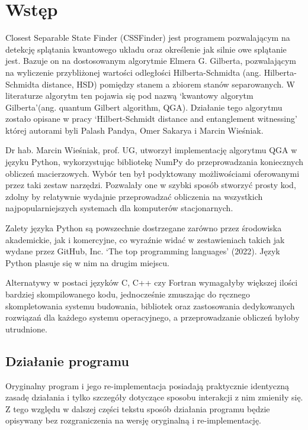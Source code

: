 \documentclass[11pt, a4paper]{article}
\begin{document}
  \begin{sloppypar}
    \section{Wstęp}
    Closest Separable State Finder (CSSFinder) jest programem pozwalającym na detekcję splątania
    kwantowego układu oraz określenie jak silnie owe splątanie jest. Bazuje on na
    dostosowanym algorytmie Elmera G. Gilberta\cite{Lindemann_Gilbert}, pozwalającym na wyliczenie
    przybliżonej wartości odległości Hilberta-Schmidta (ang. Hilberta-Schmidta distance,
    HSD) pomiędzy stanem a zbiorem stanów separowanych. W literaturze algorytm ten
    pojawia się pod nazwą `kwantowy algorytm Gilberta'(ang. quantum Gilbert algorithm,
    QGA)\cite{MW_Variational_approach}. Działanie tego algorytmu zostało opisane w pracy
    `Hilbert-Schmidt distance and entanglement witnessing' której autorami byli Palash Pandya,
    Omer Sakarya i Marcin Wieśniak\cite{MW_Hilbert_Schmidt_distance}.

    Dr hab. Marcin Wieśniak, prof. UG, utworzył implementację algorytmu QGA w języku Python,
    wykorzystując bibliotekę NumPy do przeprowadzania koniecznych obliczeń macierzowych.
    Wybór ten był podyktowany możliwościami oferowanymi przez taki zestaw narzędzi.
    Pozwalały one w szybki sposób stworzyć prosty kod, zdolny by relatywnie wydajnie przeprowadzać
    obliczenia na wszystkich najpopularniejszych systemach dla komputerów stacjonarnych.

    Zalety języka Python są powszechnie dostrzegane zarówno przez środowiska akademickie,
    jak i komercyjne, co wyraźnie widać w zestawieniach takich jak wydane przez GitHub,
    Inc. `The top programming languages' (2022)\cite{GitHub_Top_languages}. Język Python
    plasuje się w nim na drugim miejscu.

    Alternatywy w postaci języków C, C++ czy Fortran wymagałyby większej ilości bardziej
    skompilowanego kodu, jednocześnie zmuszając do ręcznego skompletowania systemu budowania,
    bibliotek oraz zastosowania dedykowanych rozwiązań dla każdego systemu operacyjnego,
    a przeprowadzanie obliczeń byłoby utrudnione.

    \subsection{Działanie programu}
    Oryginalny program i jego re-implementacja posiadają praktycznie identyczną zasadę działania
    i tylko szczegóły dotyczące sposobu interakcji z nim zmieniły się. Z tego względu w
    dalszej części tekstu sposób działania programu będzie opisywany bez rozgraniczenia
    na wersję oryginalną i re-implementację.


\end{sloppypar}
\end{document}
